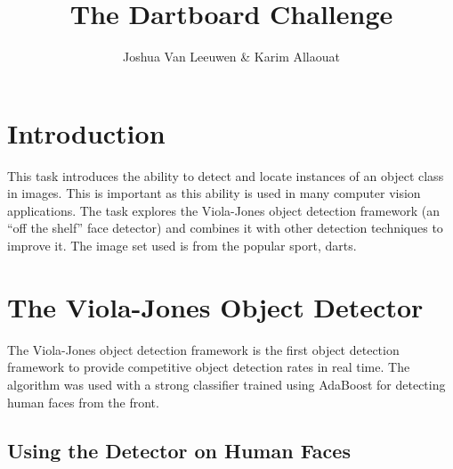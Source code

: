 \documentclass[a4paper]{article}
\title{The Dartboard Challenge}
\author{Joshua Van Leeuwen \& Karim Allaouat}
\begin{document}
\maketitle

\setcounter{section}{-1}
\section{Introduction}

This task introduces the ability to detect and locate instances of an object
class in images. This is important as this ability is used in many computer
vision applications. The task explores the Viola-Jones object detection
framework (an “off the shelf” face detector) and combines it with other
detection techniques to improve it. The image set used is from the popular
sport, darts.

\section{The Viola-Jones Object Detector}

The Viola-Jones object detection framework is the first object detection
framework to provide competitive object detection rates in real time. The
algorithm was used with a strong classifier trained using AdaBoost for
detecting human faces from the front.

\subsection*{Using the Detector on Human Faces}
\end{document}
